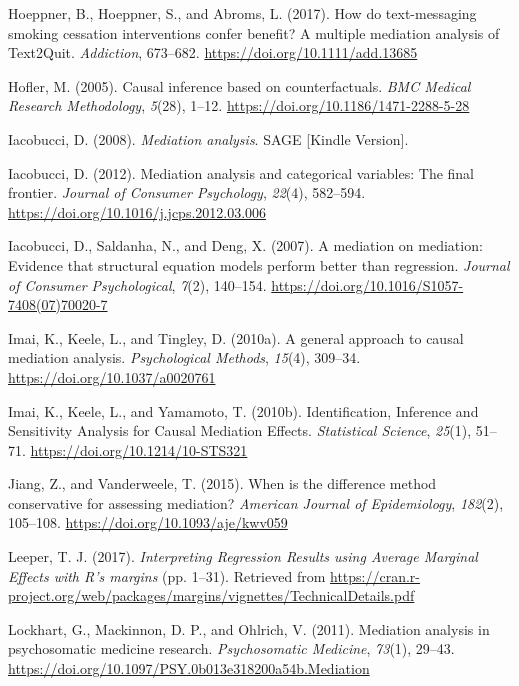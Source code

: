\documentclass[]{DissertateUSU}
\begin{document}
\hypertarget{ref-Hoeppner2017}{}
Hoeppner, B., Hoeppner, S., and Abroms, L. (2017). How do text-messaging
smoking cessation interventions confer benefit? A multiple mediation
analysis of Text2Quit. \emph{Addiction}, 673--682.
\url{https://doi.org/10.1111/add.13685}

\hypertarget{ref-Hofler2005}{}
Hofler, M. (2005). Causal inference based on counterfactuals. \emph{BMC
Medical Research Methodology}, \emph{5}(28), 1--12.
\url{https://doi.org/10.1186/1471-2288-5-28}

\hypertarget{ref-Iacobucci2008book}{}
Iacobucci, D. (2008). \emph{Mediation analysis}. SAGE {[}Kindle
Version{]}.

\hypertarget{ref-Iacobucci2012}{}
Iacobucci, D. (2012). Mediation analysis and categorical variables: The
final frontier. \emph{Journal of Consumer Psychology}, \emph{22}(4),
582--594. \url{https://doi.org/10.1016/j.jcps.2012.03.006}

\hypertarget{ref-Iacobucci2007}{}
Iacobucci, D., Saldanha, N., and Deng, X. (2007). A mediation on
mediation: Evidence that structural equation models perform better than
regression. \emph{Journal of Consumer Psychological}, \emph{7}(2),
140--154. \url{https://doi.org/10.1016/S1057-7408(07)70020-7}

\hypertarget{ref-Imai2010a}{}
Imai, K., Keele, L., and Tingley, D. (2010a). A general approach to
causal mediation analysis. \emph{Psychological Methods}, \emph{15}(4),
309--34. \url{https://doi.org/10.1037/a0020761}

\hypertarget{ref-Imai2010b}{}
Imai, K., Keele, L., and Yamamoto, T. (2010b). Identification, Inference
and Sensitivity Analysis for Causal Mediation Effects. \emph{Statistical
Science}, \emph{25}(1), 51--71. \url{https://doi.org/10.1214/10-STS321}

\hypertarget{ref-Jiang2015}{}
Jiang, Z., and Vanderweele, T. (2015). When is the difference method
conservative for assessing mediation? \emph{American Journal of
Epidemiology}, \emph{182}(2), 105--108.
\url{https://doi.org/10.1093/aje/kwv059}

\hypertarget{ref-Leeper2017}{}
Leeper, T. J. (2017). \emph{Interpreting Regression Results using
Average Marginal Effects with R's margins} (pp. 1--31). Retrieved from
\url{https://cran.r-project.org/web/packages/margins/vignettes/TechnicalDetails.pdf}

\hypertarget{ref-Lockhart2011}{}
Lockhart, G., Mackinnon, D. P., and Ohlrich, V. (2011). Mediation
analysis in psychosomatic medicine research. \emph{Psychosomatic
Medicine}, \emph{73}(1), 29--43.
\url{https://doi.org/10.1097/PSY.0b013e318200a54b.Mediation}
\end{document}
